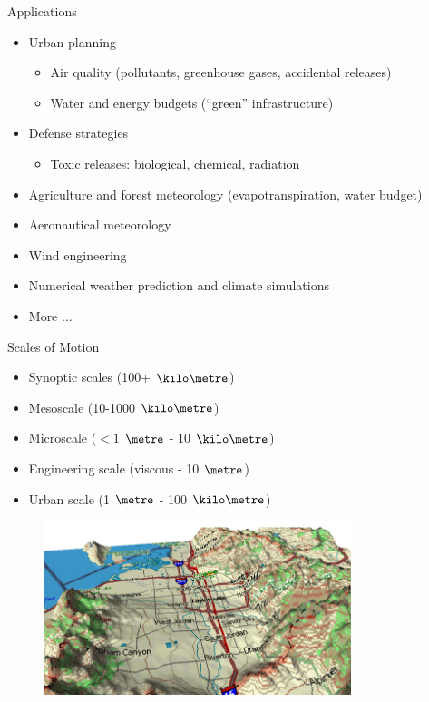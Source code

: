 \begin{frame}{Applications}

\begin{itemize}
	\item Urban planning
	\begin{itemize}
		\item Air quality (pollutants, greenhouse gases, accidental releases)
		\item Water and energy budgets (``green'' infrastructure)
	\end{itemize}
	\item Defense strategies
	\begin{itemize}
		\item Toxic releases: biological, chemical, radiation
	\end{itemize}
	\item Agriculture and forest meteorology (evapotranspiration, water budget)
	\item Aeronautical meteorology
	\item Wind engineering
	\item Numerical weather prediction and climate simulations
	\item More ...
\end{itemize}

\end{frame}

\begin{frame}{Scales of Motion}

\begin{itemize}
	\item Synoptic scales (100+ $\kilo\metre$)
	\item Mesoscale (10-1000 $\kilo\metre$)
	\item Microscale ($<1$ $\metre$ - 10 $\kilo\metre$)
	\item Engineering scale (viscous - 10 $\metre$)
	\item Urban scale (1 $\metre$ - 100 $\kilo\metre$)
\end{itemize}

\begin{figure}
	\includegraphics[width=0.8\textwidth]{scales1.png}
\end{figure}

\end{frame}

